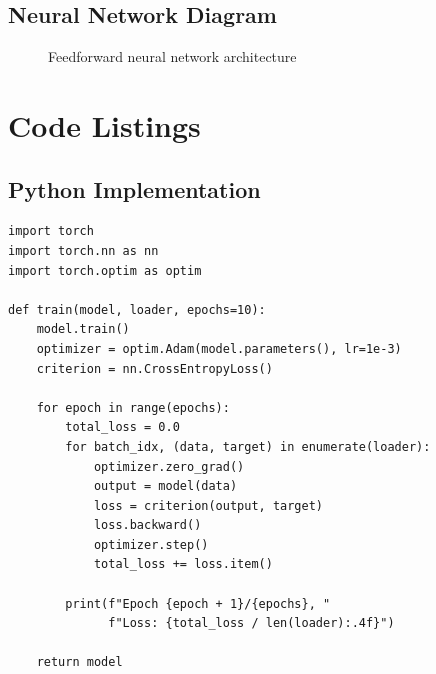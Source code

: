 \documentclass[11pt,a4paper]{article}
\begin{document}
\subsection{Neural Network Diagram}
\begin{figure}[htbp]
    \centering
    \caption{Feedforward neural network architecture}
    \label{fig:neural_net}
\end{figure}

\section{Code Listings}

\subsection{Python Implementation}

\begin{lstlisting}[caption={PyTorch training loop}, label={lst:training}]
import torch
import torch.nn as nn
import torch.optim as optim

def train(model, loader, epochs=10):
    model.train()
    optimizer = optim.Adam(model.parameters(), lr=1e-3)
    criterion = nn.CrossEntropyLoss()

    for epoch in range(epochs):
        total_loss = 0.0
        for batch_idx, (data, target) in enumerate(loader):
            optimizer.zero_grad()
            output = model(data)
            loss = criterion(output, target)
            loss.backward()
            optimizer.step()
            total_loss += loss.item()

        print(f"Epoch {epoch + 1}/{epochs}, "
              f"Loss: {total_loss / len(loader):.4f}")

    return model
\end{lstlisting}
\end{document}
